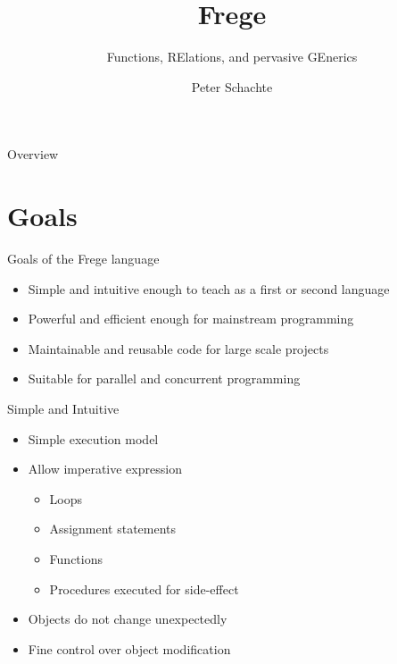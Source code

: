 \documentclass[12pt]{beamer}
\title{Frege}
\subtitle{\textsf{F}unctions, \textsf{RE}lations, and 
pervasive \textsf{GE}nerics}
\author{Peter Schachte}
\institute[Univ.\ Melbourne] %
{
  Department of Computer Science and Software Engineering \\
  University of Melbourne
}
\date{}
\newcommand{\frege}{\textsf{Frege}\xspace}
\begin{document}
\begin{frame}
  \titlepage
\end{frame}

\begin{frame}{Overview}
  \tableofcontents
\end{frame}



\section{Goals}
\begin{frame}{\LARGE Goals of the \frege language}
  \begin{itemize}
  \item Simple and intuitive enough to teach as a first or second language
  \item Powerful and efficient enough for mainstream programming
  \item Maintainable and reusable code for large scale projects
  \item Suitable for parallel and concurrent programming
  \end{itemize}
\end{frame}


\begin{frame}{\LARGE Simple and Intuitive}
  \begin{itemize}
  \item Simple execution model
  \item Allow imperative expression
    \begin{itemize}
    \item Loops
    \item Assignment statements
    \item Functions
    \item Procedures executed for side-effect
    \end{itemize}
  \item Objects do not change unexpectedly
  \item Fine control over object modification
  \end{itemize}
\end{frame}
\end{document}
